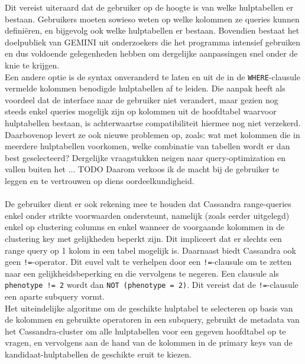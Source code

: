 Dit vereist uiteraard dat de gebruiker op de hoogte is van welke hulptabellen er bestaan. Gebruikers moeten sowieso weten op welke kolommen ze queries kunnen defini\"eren, en bijgevolg ook welke hulptabellen er bestaan. Bovendien bestaat het doelpubliek van GEMINI uit onderzoekers die het programma intensief gebruiken en dus voldoende gelegenheden hebben om dergelijke aanpassingen snel onder de knie te krijgen.\\
Een andere optie is de syntax onveranderd te laten en uit de in de \texttt{WHERE}-clausule vermelde kolommen benodigde hulptabellen af te leiden. Die aanpak heeft als voordeel dat de interface naar de gebruiker niet verandert, maar gezien nog steeds enkel queries mogelijk zijn op kolommen uit de hoofdtabel waarvoor hulptabellen bestaan, is achterwaartse compatibiliteit hiermee nog niet verzekerd. Daarbovenop levert ze ook nieuwe problemen op, zoals: wat met kolommen die in meerdere hulptabellen voorkomen, welke combinatie van tabellen wordt er dan best geselecteerd? Dergelijke vraagstukken neigen naar query-optimization en vallen buiten het ... {\color{red} TODO} Daarom verkoos ik de macht bij de gebruiker te leggen en te vertrouwen op diens oordeelkundigheid.\\\\
De gebruiker dient er ook rekening mee te houden dat Cassandra range-queries enkel onder strikte voorwaarden ondersteunt, namelijk (zoals eerder uitgelegd) enkel op clustering columns en enkel wanneer de voorgaande kolommen in de clustering key met gelijkheden beperkt zijn. Dit impliceert dat er slechts een range query op 1 kolom in een tabel mogelijk is. Daarnaast biedt Cassandra ook geen \texttt{!=}-operator. Dit euvel valt te verhelpen door een \texttt{!=}-clausule om te zetten naar een gelijkheidsbeperking en die vervolgens te negeren. Een clausule als \texttt{phenotype != 2} wordt dan \texttt{NOT (phenotype = 2)}. Dit vereist dat de \texttt{!=}-clausule een aparte subquery vormt.\\

Het uiteindelijke algoritme om de geschikte hulptabel te selecteren op basis van de kolommen en gebruikte operatoren in een subquery, gebruikt de metadata van het Cassandra-cluster om alle hulptabellen voor een gegeven hoofdtabel op te vragen, en vervolgens aan de hand van de kolommen in de primary keys van de kandidaat-hulptabellen de geschikte eruit te kiezen.\\

